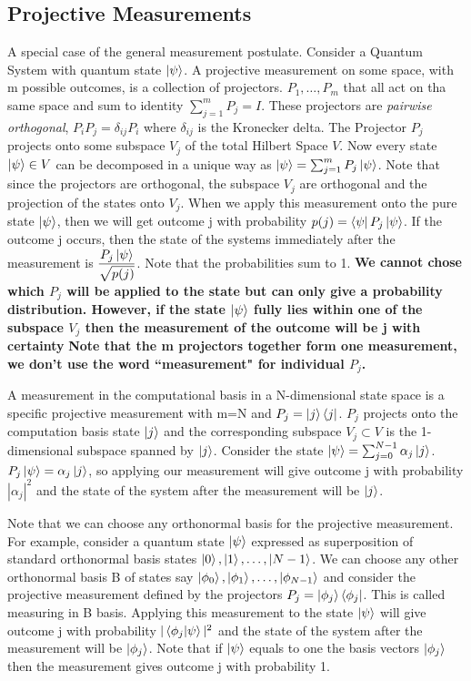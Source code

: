 \subsection{Projective Measurements}
A special case of the general measurement postulate. Consider a Quantum System with quantum state $\ket{\psi}$. A projective measurement on some space, with m possible outcomes, is a collection of projectors.
$P_1,\ldots,P_m$ that all act on tha same space and sum to identity $\sum_{j=1}^m P_j=I$. These projectors are \textit{pairwise orthogonal},
$P_iP_j=\delta_{ij}P_i$ where $\delta_{ij}$ is the Kronecker delta. The Projector $P_j$ projects onto some subspace $V_j$ of the total Hilbert Space $V$. 
Now every state $\ket{\psi} \in V$ can be decomposed in a unique way as $\ket{\psi}=\sum_{j=1}^m P_j\ket{\psi}$. Note that since the projectors
are orthogonal, the subspace $V_j$ are orthogonal and the projection of the states onto $V_j$. When we apply this measurement onto the pure
state $\ket{\psi}$, then we will get outcome j with probability $p(j)=\bra{\psi}P_j\ket{\psi}$. If the outcome j occurs, then the state of the systems
immediately after the measurement is $\dfrac{P_j\ket{\psi}}{\sqrt{p(j)}}$. Note that the probabilities sum to 1.
\textbf{We cannot chose which $P_j$ will be applied to the state but can only give a probability distribution. However, if the state $\ket{\psi}$ fully lies within
one of the subspace $V_j$ then the measurement of the outcome will be j with certainty}
\textbf{Note that the m projectors together form one measurement, we don't use the word ``measurement" for individual $P_j$.}
\begin{example}
    A measurement in the computational basis in a N-dimensional state space is a specific projective measurement
    with m=N and $P_j=\ket{j}\bra{j}$. $P_j$ projects onto the computation basis state $\ket{j}$ and the corresponding
    subspace $V_j \subset V$  is the 1-dimensional subspace spanned by $\ket{j}$. 
    Consider the state $\ket{\psi} = \sum_{j=0}^{N-1} \alpha_j \ket{j}$. $P_j\ket{\psi}=\alpha_j\ket{j}$, so applying our measurement
    will give outcome j with probability $|\alpha_j|^2$ and the state of the system after the measurement will be $\ket{j}$.
\end{example}


\begin{example}
    Note that we can choose any orthonormal basis for the projective measurement. For example, consider
    a quantum state $\ket{\psi}$ expressed as superposition of standard orthonormal basis states $\ket{0},\ket{1},\ldots,\ket{N-1}$. 
    We can choose any other orthonormal basis B of states say $\ket{\phi_0},\ket{\phi_1},\ldots,\ket{\phi_{N-1}}$
    and consider the projective measurement defined by the projectors $P_j=\ket{\phi_j}\bra{\phi_j}$.
    This is called measuring in B basis. Applying this measurement to the state $\ket{\psi}$ will give 
    outcome j with probability $|\braket{\phi_j|\psi}|^2$ and the state of the system after the measurement will be $\ket{\phi_j}$.
    Note that if $\ket{\psi}$ equals to one the basis vectors $\ket{\phi_j}$ then the measurement
    gives outcome j with probability 1.
\end{example}

